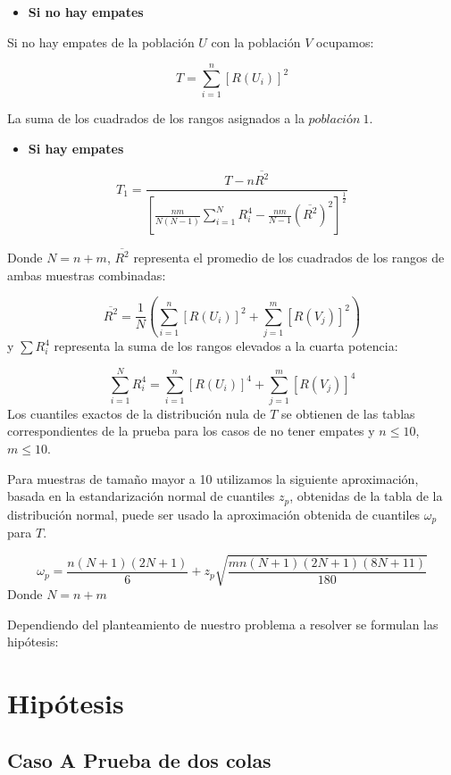 \documentclass[
  a4paper,
  oneside,
  openany]{book}
\providecommand{\tightlist}{%
  \setlength{\itemsep}{0pt}\setlength{\parskip}{0pt}}
\begin{document}
\begin{itemize}
\tightlist
\item
  \textbf{Si no hay empates}
\end{itemize}

Si no hay empates de la población \(U\) con la población \(V\) ocupamos:

\[T=\sum_{i=1}^{n}[R(U_{i})]^2\]

La suma de los cuadrados de los rangos asignados a la \(población \ 1\).

\begin{itemize}
\tightlist
\item
  \textbf{Si hay empates}
\end{itemize}

\[T_{1} = \frac{T-n\overline{R^2}}{\left[\frac{nm}{N(N-1)}\sum_{i=1}^{N}R_{i}^4-\frac{nm}{N-1}(\overline{R^2})^2\right]^\frac{1}{2}}\]

Donde \(N= n+m\), \(\overline{R^2}\) representa el promedio de los cuadrados de los rangos de ambas muestras combinadas:

\[\overline{R^2}= \frac{1}{N}\left(\sum_{i=1}^{n}[R(U_{i})]^2+\sum_{j=1}^{m}[R(V_{j})]^2\right)\]
y \(\sum R_{i}^4\) representa la suma de los rangos elevados a la cuarta potencia:

\[ \sum_{i=1}^{N}R_{i}^4= \sum_{i=1}^{n}[R(U_{i})]^4+\sum_{j=1}^{m}[R(V_{j})]^4\]
Los cuantiles exactos de la distribución nula de \(T\) se obtienen de las tablas correspondientes de la prueba para los casos de no tener empates y \(n \leq 10\), \(m \leq 10\).

Para muestras de tamaño mayor a 10 utilizamos la siguiente aproximación, basada en la estandarización normal de cuantiles \(z_p\), obtenidas de la tabla de la distribución normal, puede ser usado la aproximación obtenida de cuantiles \(\omega_p\) para \(T\).

\[\omega_p= \frac{n(N+1)(2N+1)}{6}+z_{p}\sqrt{\frac{mn(N+1)(2N+1)(8N+11)}{180}}\]
Donde \(N= n+m\)

Dependiendo del planteamiento de nuestro problema a resolver se formulan las hipótesis:

\hypertarget{hipuxf3tesis-7}{%
\section{Hipótesis}\label{hipuxf3tesis-7}}

\hypertarget{caso-a-prueba-de-dos-colas-6}{%
\subsection*{Caso A Prueba de dos colas}\label{caso-a-prueba-de-dos-colas-6}}
\end{document}
